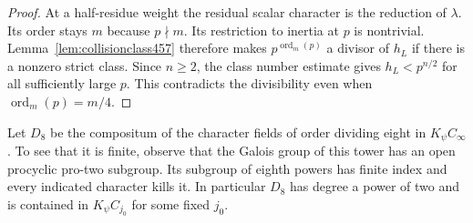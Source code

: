 \documentclass[a4paper,11pt]{article}
\theoremstyle{definition}
\theoremstyle{remark}
\numberwithin{equation}{section}
\begin{document}
\begin{proof}
At a half-residue weight the residual scalar character is
the reduction of \(\lambda\). Its order stays \(m\) because
\(p\nmid m\). Its restriction to inertia at \(p\) is nontrivial.
Lemma~\ref{lem:collisionclass457} therefore makes
\(p^{\operatorname{ord}_m(p)}\) a divisor of \(h_L\) if
there is a nonzero strict class. Since \(n\ge2\), the class
number estimate gives \(h_L<p^{n/2}\) for all sufficiently
large \(p\). This contradicts the divisibility even when
\(\operatorname{ord}_m(p)=m/4\).
\end{proof}

Let \(D_8\) be the compositum of the character fields of order
dividing eight in \(K_\psi C_\infty\). To see that it is finite,
observe that the Galois group of this tower has an open procyclic pro-two
subgroup. Its subgroup of eighth powers has finite index
and every indicated character kills it. In particular \(D_8\)
has degree a power of two and is contained in \(K_\psi C_{j_0}\)
for some fixed \(j_0\).
\end{document}

